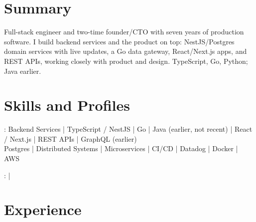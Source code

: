 \documentclass[print]{jack-resume}
\begin{document}
\pagecolor{darkmodeBackground}


\begin{minipage}[t][1cm][t]{.03\textwidth}
    \hfill
\end{minipage}

\section{Summary}
Full-stack engineer and two-time founder/CTO with seven years of production software. I build backend services and the product on top: NestJS/Postgres domain services with live updates, a Go data gateway, React/Next.js apps, and REST APIs, working closely with product and design. TypeScript, Go, Python; Java earlier.
\sectionsep

\section{Skills and Profiles}
:
Backend Services \hfill | \hfill
TypeScript / NestJS \hfill | \hfill
Go \hfill | \hfill
Java (earlier, not recent) \hfill | \hfill
React / Next.js \hfill | \hfill
REST APIs \hfill | \hfill
GraphQL (earlier) \\
\hspace{1.0cm} Postgres \hfill | \hfill
Distributed Systems \hfill | \hfill
Microservices \hfill | \hfill
CI/CD \hfill | \hfill
Datadog \hfill | \hfill
Docker \hfill | \hfill
AWS \\

\raggedright{
    :
      \href{https://www.linkedin.com/in/jack-sturtevant/}{ \ExternalLink} |
     \href{https://github.com/jacksturt}{ \ExternalLink}}

\section{Experience}
\end{document}
